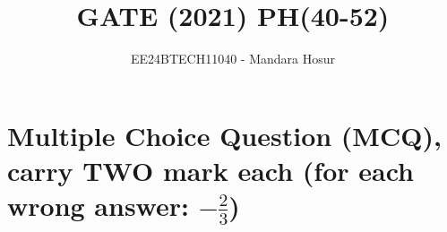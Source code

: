 \documentclass[journal]{IEEEtran}
\begin{document}

\vspace{3cm}

\title{GATE (2021) PH(40-52)}
\author{EE24BTECH11040 - Mandara Hosur}
{\let\newpage\relax\maketitle}

\renewcommand{\thefigure}{\theenumi}
\renewcommand{\thetable}{\theenumi}
\setlength{\intextsep}{10pt} %


\renewcommand{\thetable}{\theenumi}

\section*{\textbf{Multiple Choice Question (MCQ), carry TWO mark each (for each wrong answer: $-\frac{2}{3}$)}}
\end{document}
